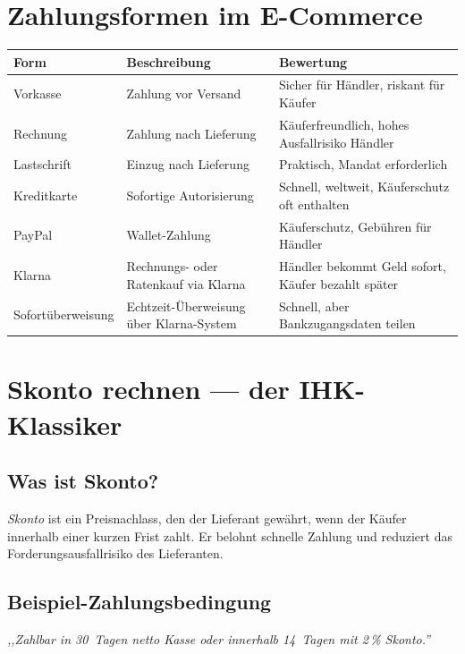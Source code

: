 \documentclass[11pt, a4paper]{article}
\begin{document}
\section{Zahlungsformen im E-Commerce}

\begin{center}
\begin{tabular}{p{3cm} p{6cm} p{4.5cm}}
\toprule
\textbf{Form} & \textbf{Beschreibung} & \textbf{Bewertung}\\
\midrule
Vorkasse & Zahlung vor Versand & Sicher für Händler, riskant für Käufer\\
Rechnung & Zahlung nach Lieferung & Käuferfreundlich, hohes Ausfallrisiko Händler\\
Lastschrift & Einzug nach Lieferung & Praktisch, Mandat erforderlich\\
Kreditkarte & Sofortige Autorisierung & Schnell, weltweit, Käuferschutz oft enthalten\\
PayPal & Wallet-Zahlung & Käuferschutz, Gebühren für Händler\\
Klarna & Rechnungs- oder Ratenkauf via Klarna & Händler bekommt Geld sofort, Käufer bezahlt später\\
Sofortüberweisung & Echtzeit-Überweisung über Klarna-System & Schnell, aber Bankzugangsdaten teilen\\
\bottomrule
\end{tabular}
\end{center}

\section{Skonto rechnen --- der IHK-Klassiker}

\subsection{Was ist Skonto?}

\emph{Skonto} ist ein Preisnachlass, den der Lieferant gewährt, wenn der Käufer
innerhalb einer kurzen Frist zahlt. Er belohnt schnelle Zahlung und reduziert das
Forderungsausfallrisiko des Lieferanten.

\subsection{Beispiel-Zahlungsbedingung}

\textit{,,Zahlbar in 30~Tagen netto Kasse oder innerhalb 14~Tagen mit 2\,\% Skonto.''}
\end{document}
